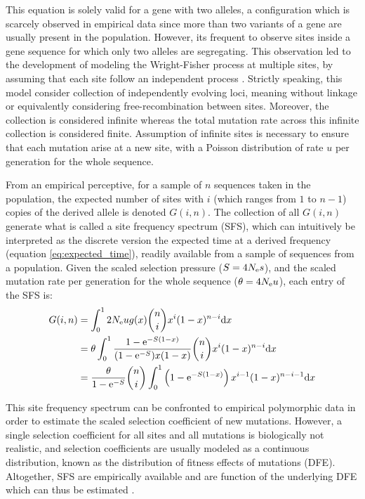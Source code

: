 This equation is solely valid for a gene with two \glspl{allele}, a configuration which is scarcely observed in empirical data since more than two variants of a gene are usually present in the population.
However, its frequent to observe sites inside a gene sequence for which only two \glspl{allele} are segregating.
This observation led to the development of modeling the Wright-Fisher process at multiple sites, by assuming that each site follow an independent process \citep{Sawyer1992}.
Strictly speaking, this model consider collection of independently evolving loci, meaning without linkage or equivalently considering free-recombination between sites.
Moreover, the collection is considered infinite whereas the total mutation rate across this infinite collection is considered finite.
Assumption of infinite sites is necessary to ensure that each mutation arise at a new site, with a Poisson distribution of rate $u$ per generation for the whole sequence.

From an empirical perceptive, for a sample of $n$ sequences taken in the population, the expected number of sites with $i$ (which ranges from $1$ to $n-1$) copies of the derived \gls{allele} is denoted $G(i, n)$. 
The collection of all $G(i, n)$ generate what is called a site frequency spectrum (\acrshort{SFS}), which can intuitively be interpreted as the discrete version the expected time at a derived frequency (equation \ref{eq:expected_time}), readily available from a sample of sequences from a population.
Given the scaled selection pressure ($S=4 N_{\textrm{e}} s$), and the scaled mutation rate per generation for the whole sequence ($\theta = 4 N_{\textrm{e}} u $), each entry of the \acrshort{SFS} is:
\begin{align}
	G(i, n) & = \int_{0}^{1}  2 N_{\textrm{e}} u g(x) \binom{n}{i} x^{i} (1-x)^{n-i} \mathrm{d} x \\
	& = \theta \int_{0}^{1} \dfrac{1 - \mathrm{e}^{-S(1-x)}}{(1 - \mathrm{e}^{-S})x(1-x)} \binom{n}{i} x^{i} (1-x)^{n-i} \mathrm{d} x \\
	& =  \dfrac{\theta }{1 - \mathrm{e}^{-S}} \binom{n}{i} \int_{0}^{1} \left( 1 - \mathrm{e}^{-S(1-x)} \right) x^{i-1} (1-x)^{n-i-1} \mathrm{d} x 
\end{align}

This site frequency spectrum can be confronted to empirical \gls{polymorphic} data in order to estimate the scaled selection coefficient of new mutations.
However, a single selection coefficient for all sites and all mutations is biologically not realistic, and selection coefficients are usually modeled as a continuous distribution, known as the distribution of fitness effects of mutations (\acrshort{DFE}).
Altogether, \acrshort{SFS} are empirically available and are function of the underlying \acrshort{DFE} which can thus be estimated \citep{eyre-walker_distribution_2006, eyre-walker_estimating_2009}. 

